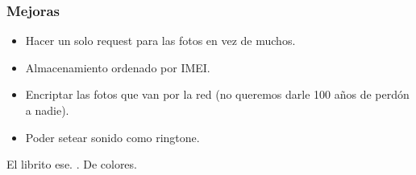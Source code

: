 \documentclass[10pt, a4paper,english,spanish]{article}
\begin{document}
\subsubsection{Mejoras} %
\label{ssub:Mejoras}
\begin{itemize}
	\item Hacer un solo request para las fotos en vez de muchos.
	\item Almacenamiento ordenado por IMEI.
	\item Encriptar las fotos que van por la red (no queremos darle 100 años de perdón a nadie).
	\item Poder setear sonido como ringtone.
\end{itemize}



\begin{thebibliography}{8}
\raggedright

	El librito ese.
	.
	\newblock De colores.

\end{thebibliography}
\end{document}
